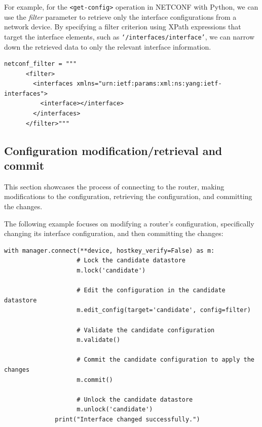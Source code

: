 For example, for the \texttt{<get-config>} operation in NETCONF with Python, we can use the \textit{filter} parameter to retrieve only the interface configurations from a network device. By specifying a filter criterion using XPath expressions that target the interface elements, such as \texttt{`/interfaces/interface'}, we can narrow down the retrieved data to only the relevant interface information.

\begin{lstlisting}[style=pythonStyle, caption={Filter for interfaces.}, backgroundcolor=\color{codebackground}]
  netconf_filter = """
      <filter>
        <interfaces xmlns="urn:ietf:params:xml:ns:yang:ietf-interfaces">
          <interface></interface>
        </interfaces>
      </filter>"""          
\end{lstlisting}

\subsection{Configuration modification/retrieval and commit}

This section showcases the process of connecting to the router, making modifications to the configuration, retrieving the configuration, and committing the changes.

The following example focuses on modifying a router's configuration, specifically changing its interface configuration, and then committing the changes:
\begin{lstlisting}[style=pythonStyle, caption={Changing the interface.}, backgroundcolor=\color{codebackground}]
              with manager.connect(**device, hostkey_verify=False) as m:
                    # Lock the candidate datastore
                    m.lock('candidate')

                    # Edit the configuration in the candidate datastore
                    m.edit_config(target='candidate', config=filter)

                    # Validate the candidate configuration
                    m.validate()

                    # Commit the candidate configuration to apply the changes
                    m.commit()

                    # Unlock the candidate datastore
                    m.unlock('candidate')
              print("Interface changed successfully.")          
\end{lstlisting}

